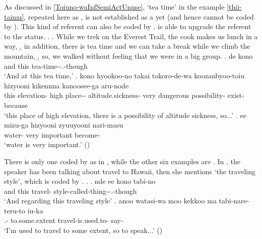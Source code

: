 As discussed in \ref{Toiuno-waInfSemiActUnuse},
`tea time' in the example \ref{thii-taimu}, repeated here as \Next, is not established as a  yet (and hence cannot be coded by ).
This kind of referent can also be coded by .
 is able to upgrade the referent to the  status.
%
\ex.\label{thii-taimu2}
 \a. While we trek on the Everest Trail, the cook makes us lunch in a way,
 \b. in addition, there is tea time and we can take a break while we climb the mountain,
 \b. so, we walked without feeling that we were in a big group.
 \bg. de kono  \\
		and this tea-time--.-though \\
		`And at this tea time,'
 \bg. kono hyookoo-no {takai} {tokoro-de-wa} koozanbyoo-toiu hizyooni {kikennna} {kanoosee-ga} aru-node \\
		this elevation- high place-- altitude.sickness- very dangerous possibility- exist-because \\
		`this place of high elevation, there is a possibility of altitude sickness, so...'
 \bg. ee {mizu-ga} hizyooni zyuuyooni nari-masu \\
		 water- very important become- \\
		`water is very important.'
		 \hfill{()}

There is only one  coded by  as in \Next,
while the other six examples are .
In \Next,
the speaker has been talking about travel to Hawaii,
then she mentions `the traveling style',
which is coded by .
\ex. \ag. nde ee kono tabi-no  \\
		and  this travel- style-called-thing--.-though \\
		`And regarding this traveling style'
	\bg. anoo watasi-wa moo kekkoo ma tabi-nare-teru-to iu-ka \\
		 .-  to.some.extent  travel-is.used.to- say- \\
		`I'm used to travel to some extent, so to speak...'
		\hfill{()}
%

